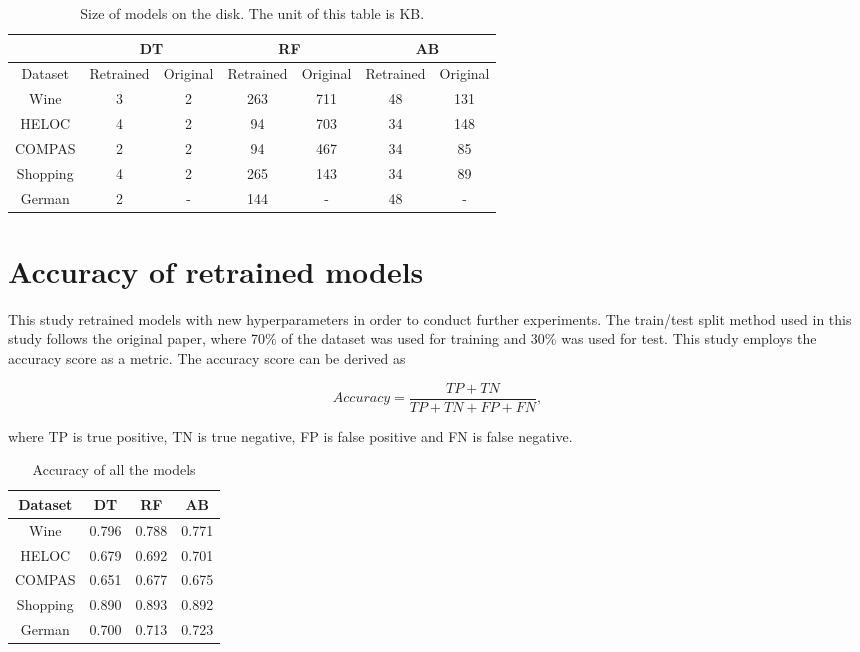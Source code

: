 \begin{table}[h]
\centering
\begin{tabular}{ccccccc}
         & \multicolumn{2}{c}{DT}    & \multicolumn{2}{c}{RF}        & \multicolumn{2}{c}{AB}       \\ \hline
Dataset &
  \multicolumn{1}{l}{Retrained} &
  \multicolumn{1}{l}{Original} &
  \multicolumn{1}{l}{Retrained} &
  \multicolumn{1}{l}{Original} &
  \multicolumn{1}{l}{Retrained} &
  \multicolumn{1}{l}{Original} \\ \hline
Wine     & \multicolumn{1}{c}{3} & 2 & \multicolumn{1}{c}{263} & 711 & \multicolumn{1}{c}{48} & 131 \\
HELOC    & \multicolumn{1}{c}{4} & 2 & \multicolumn{1}{c}{94}  & 703 & \multicolumn{1}{c}{34} & 148 \\ 
COMPAS   & \multicolumn{1}{c}{2} & 2 & \multicolumn{1}{c}{94}  & 467 & \multicolumn{1}{c}{34} & 85  \\
Shopping & \multicolumn{1}{c}{4} & 2 & \multicolumn{1}{c}{265} & 143 & \multicolumn{1}{c}{34} & 89  \\
German   & \multicolumn{1}{c}{2} & - & \multicolumn{1}{c}{144} & -   & \multicolumn{1}{c}{48} & -   \\ \hline
\end{tabular}
\caption{Size of models on the disk. The unit of this table is KB.}
\label{table:model size}
\end{table}


\section{Accuracy of retrained models}
\label{appendix:train accuracy}
This study retrained models with new hyperparameters in order to conduct further experiments. The train/test split method used in this study follows the original paper, where 70\% of the dataset was used for training and 30\% was used for test. This study employs the accuracy score as a metric. The accuracy score can be derived as

\begin{equation}
Accuracy = \frac{TP + TN}{TP + TN + FP + FN},
\end{equation}

where TP is true positive, TN is true negative, FP is false positive and FN is false negative.

\begin{table}[h]
\centering
\begin{tabular}{cccc}
Dataset  & DT    & RF    & AB    \\ \hline
Wine     & 0.796 & 0.788 & 0.771 \\
HELOC    & 0.679 & 0.692 & 0.701 \\
COMPAS   & 0.651 & 0.677 & 0.675 \\
Shopping & 0.890 & 0.893 & 0.892 \\
German   & 0.700 & 0.713 & 0.723 \\ \hline
\end{tabular}
\caption{Accuracy of all the models}
\label{table:trainAccuracy}
\end{table}

